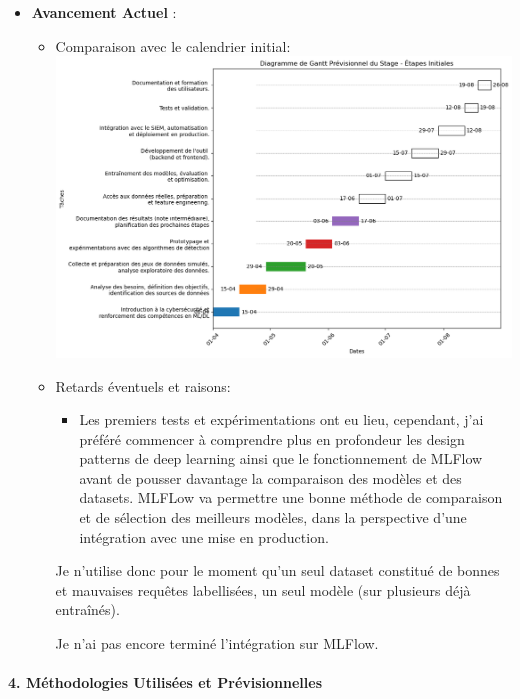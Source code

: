 \documentclass[
  letterpaper,
  DIV=11,
  numbers=noendperiod]{scrartcl}
\let\oldparagraph\paragraph
\renewcommand{\paragraph}[1]{\oldparagraph{#1}\mbox{}}
\providecommand{\tightlist}{%
  \setlength{\itemsep}{0pt}\setlength{\parskip}{0pt}}\usepackage{longtable,booktabs,array}
\begin{document}
\begin{itemize}
\tightlist
\item
  \textbf{Avancement Actuel} :

  \begin{itemize}
  \item
    Comparaison avec le calendrier initial:
    \includegraphics{images/gantt_realise.png}
  \item
    Retards éventuels et raisons:

    \begin{itemize}
    \tightlist
    \item
      Les premiers tests et expérimentations ont eu lieu, cependant,
      j'ai préféré commencer à comprendre plus en profondeur les design
      patterns de deep learning ainsi que le fonctionnement de MLFlow
      avant de pousser davantage la comparaison des modèles et des
      datasets. MLFLow va permettre une bonne méthode de comparaison et
      de sélection des meilleurs modèles, dans la perspective d'une
      intégration avec une mise en production.
    \end{itemize}

    Je n'utilise donc pour le moment qu'un seul dataset constitué de
    bonnes et mauvaises requêtes labellisées, un seul modèle (sur
    plusieurs déjà entraînés).

    Je n'ai pas encore terminé l'intégration sur MLFlow.
  \end{itemize}
\end{itemize}

\paragraph{4. Méthodologies Utilisées et
Prévisionnelles}\label{muxe9thodologies-utilisuxe9es-et-pruxe9visionnelles}
\end{document}
